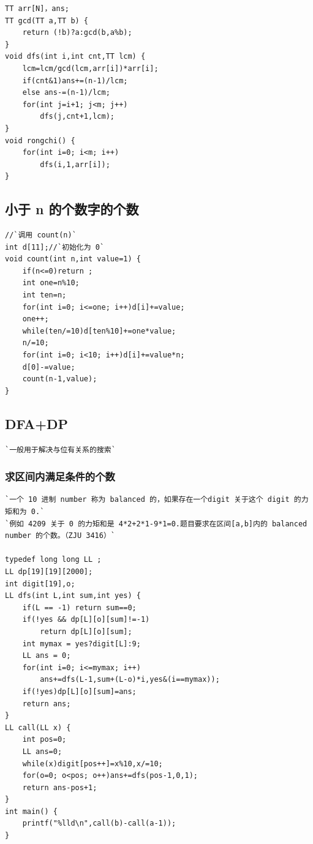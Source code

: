\documentclass[a4paper]{article}
\begin{document}
\begin{CJK*}{UTF8}{gbsn}
\begin{multicols}{3}
\begin{flushleft}
\begin{lstlisting}
TT arr[N]，ans;
TT gcd(TT a,TT b) {
    return (!b)?a:gcd(b,a%b);
}
void dfs(int i,int cnt,TT lcm) {
    lcm=lcm/gcd(lcm,arr[i])*arr[i];
    if(cnt&1)ans+=(n-1)/lcm;
    else ans-=(n-1)/lcm;
    for(int j=i+1; j<m; j++)
        dfs(j,cnt+1,lcm);
}
void rongchi() {
    for(int i=0; i<m; i++)
        dfs(i,1,arr[i]);
}
\end{lstlisting}


\subsection{小于 n 的个数字的个数}
\begin{lstlisting}
//`调用 count(n)`
int d[11];//`初始化为 0`
void count(int n,int value=1) {
    if(n<=0)return ;
    int one=n%10;
    int ten=n;
    for(int i=0; i<=one; i++)d[i]+=value;
    one++;
    while(ten/=10)d[ten%10]+=one*value;
    n/=10;
    for(int i=0; i<10; i++)d[i]+=value*n;
    d[0]-=value;
    count(n-1,value);
}
\end{lstlisting}


\subsection{DFA+DP}
\begin{lstlisting}
`一般用于解决与位有关系的搜索`
\end{lstlisting}

\subsubsection{求区间内满足条件的个数}
\begin{lstlisting}
`一个 10 进制 number 称为 balanced 的，如果存在一个digit 关于这个 digit 的力矩和为 0.`
`例如 4209 关于 0 的力矩和是 4*2+2*1-9*1=0.题目要求在区间[a,b]内的 balanced number 的个数。（ZJU 3416）`

typedef long long LL ;
LL dp[19][19][2000];
int digit[19],o;
LL dfs(int L,int sum,int yes) {
    if(L == -1) return sum==0;
    if(!yes && dp[L][o][sum]!=-1)
        return dp[L][o][sum];
    int mymax = yes?digit[L]:9;
    LL ans = 0;
    for(int i=0; i<=mymax; i++)
        ans+=dfs(L-1,sum+(L-o)*i,yes&(i==mymax));
    if(!yes)dp[L][o][sum]=ans;
    return ans;
}
LL call(LL x) {
    int pos=0;
    LL ans=0;
    while(x)digit[pos++]=x%10,x/=10;
    for(o=0; o<pos; o++)ans+=dfs(pos-1,0,1);
    return ans-pos+1;
}
int main() {
    printf("%lld\n",call(b)-call(a-1));
}
\end{lstlisting}


\end{flushleft}
\end{multicols}
\end{CJK*}
\end{document}
